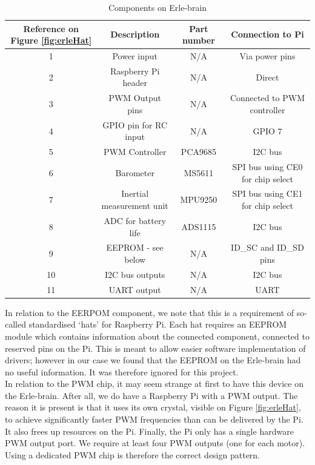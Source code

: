 \documentclass[capstone_report.tex]{subfiles}
\begin{document}
    \begin{table}[H]
    \centering
        \begin{tabular}{|c|c|c|c|}
            \hline
            Reference on Figure \ref{fig:erleHat} & Description & Part number & Connection to Pi\\
            \hline
            1 & Power input & N/A & Via power pins \\
            2 & Raspberry Pi header & N/A & Direct \\
            3 & PWM Output pins & N/A & Connected to PWM controller \\
            4 & GPIO pin for RC input & N/A & GPIO 7 \\
            5 & PWM Controller & PCA9685 & I2C bus \\
            6 & Barometer & MS5611 & SPI bus using CE0 for chip select\\
            7 & Inertial measurement unit & MPU9250 & SPI bus using CE1 for chip select\\
            8 & ADC for battery life & ADS1115 & I2C bus \\
            9 & EEPROM - see below & N/A & ID\_SC and ID\_SD pins\\
            10 & I2C bus outputs & N/A & I2C bus \\
            11 & UART output & N/A & UART \\
            \hline
        \end{tabular}
    \caption{Components on Erle-brain\label{tab:ebcomponents}}
    \end{table}

    In relation to the EERPOM component, we note that this is a requirement of so-called standardised `hats' for Raspberry Pi. Each hat requires an EEPROM module which contains information about the connected component, connected to reserved pins on the Pi. This is meant to allow easier software implementation of drivers; however in our case we found that the EEPROM on the Erle-brain had no useful information. It was therefore ignored for this project.\\

    In relation to the PWM chip, it may seem strange at first to have this device on the Erle-brain. After all, we do have a Raspberry Pi with a PWM output. The reason it is present is that it uses its own crystal, visible on Figure \ref{fig:erleHat}, to achieve significantly faster PWM frequencies than can be delivered by the Pi. It also frees up resources on the Pi. Finally, the Pi only has a single hardware PWM output port. We require at least four PWM outputs (one for each motor). Using a dedicated PWM chip is therefore the correct design pattern.
\end{document}

